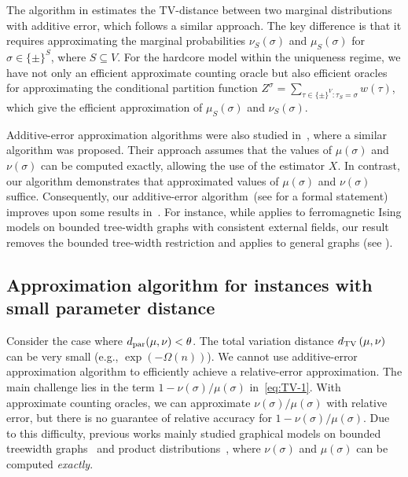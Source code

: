 The algorithm in  estimates the TV-distance between two marginal distributions with additive error, which follows a similar approach. The key difference is that it requires approximating the marginal probabilities $\nu_S(\sigma)$ and $\mu_S(\sigma)$ for $\sigma \in \{\pm\}^S$, where $S \subseteq V$. For the hardcore model within the uniqueness regime, we have not only an efficient approximate counting oracle but also efficient oracles for approximating the conditional partition function $Z^\sigma = \sum_{\tau \in \{\pm\}^V: \tau_S = \sigma} w(\tau)$, which give the efficient approximation of $\mu_S(\sigma)$ and $\nu_S(\sigma)$.


Additive-error approximation algorithms were also studied in~\cite{0001GMV20}, where a similar algorithm was proposed. Their approach assumes that the values of $\mu(\sigma)$ and $\nu(\sigma)$ can be computed exactly, allowing the use of the estimator $X$. In contrast, our algorithm demonstrates that approximated values of $\mu(\sigma)$ and $\nu(\sigma)$ suffice. Consequently, our additive-error algorithm~(see  for a formal statement) improves upon some results in~\cite{0001GMV20}. For instance, while \cite{0001GMV20} applies to ferromagnetic Ising models on bounded tree-width graphs with consistent external fields, our result removes the bounded tree-width restriction and applies to general graphs (see ).



\subsection{Approximation algorithm for instances with small parameter distance}\label{sec:mul-alg}
Consider the case where $d_\mathrm{par}(\mu, \nu) < \theta$. The total variation distance $d_{\mathrm{TV}}\left({\mu},{\nu}\right)$ can be very small (e.g., $\exp(-\Omega(n))$). We cannot use additive-error approximation algorithm to efficiently achieve a relative-error approximation. The main challenge lies in the term $1 - {\nu(\sigma)}/{\mu(\sigma)}$ in~\eqref{eq:TV-1}. With approximate counting oracles, we can approximate ${\nu(\sigma)}/{\mu(\sigma)}$ with relative error, but there is no guarantee of relative accuracy for $1 - {\nu(\sigma)}/{\mu(\sigma)}$. Due to this difficulty, previous works mainly studied graphical models on bounded treewidth graphs~\cite{0001GMM0V24} and product distributions~\cite{FGJW23}, where ${\nu(\sigma)}$ and ${\mu(\sigma)}$ can be computed \emph{exactly}.

